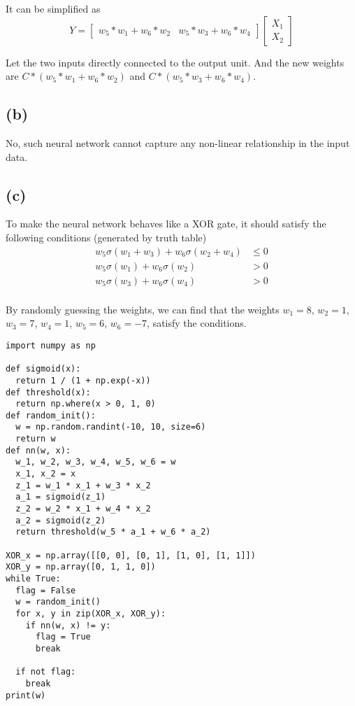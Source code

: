 \documentclass[a4paper,12pt]{article}
\begin{document}
It can be simplified as
\begin{equation*}
	Y = 
	\begin{bmatrix}
		w_5*w_1 + w_6*w_2 & w_5*w_3 + w_6*w_4
	\end{bmatrix}
	\begin{bmatrix}
		X_1 \\
		X_2
	\end{bmatrix}
\end{equation*}

Let the two inputs directly connected to the output unit. And the new weights are $C * (w_5*w_1 + w_6*w_2)$ and $C * (w_5*w_3 + w_6*w_4)$.

\subsection*{(b)}

No, such neural network cannot capture any non-linear relationship in the input data.

\subsection*{(c)}

To make the neural network behaves like a XOR gate, it should satisfy the following conditions (generated by truth table)
\begin{align*}
	w_5 \sigma(w_1 + w_3) + w_6 \sigma(w_2 + w_4) &\leq 0 \\
	w_5 \sigma(w_1) + w_6 \sigma(w_2) &> 0 \\
	w_5 \sigma(w_3) + w_6 \sigma(w_4) &> 0 \\
\end{align*}

By randomly guessing the weights, we can find that the weights $w_1 = 8$, $w_2 = 1$, $w_3 = 7$, $w_4 = 1$, $w_5 = 6$, $w_6 = -7$,  satisfy the conditions.

\begin{verbatim}
import numpy as np

def sigmoid(x):
  return 1 / (1 + np.exp(-x))
def threshold(x):
  return np.where(x > 0, 1, 0)
def random_init():
  w = np.random.randint(-10, 10, size=6)
  return w
def nn(w, x):
  w_1, w_2, w_3, w_4, w_5, w_6 = w
  x_1, x_2 = x
  z_1 = w_1 * x_1 + w_3 * x_2
  a_1 = sigmoid(z_1)
  z_2 = w_2 * x_1 + w_4 * x_2
  a_2 = sigmoid(z_2)
  return threshold(w_5 * a_1 + w_6 * a_2)

XOR_x = np.array([[0, 0], [0, 1], [1, 0], [1, 1]])
XOR_y = np.array([0, 1, 1, 0])
while True:
  flag = False
  w = random_init()
  for x, y in zip(XOR_x, XOR_y):
    if nn(w, x) != y:
      flag = True
      break
      
  if not flag:
    break
print(w)
\end{verbatim}
\end{document}
